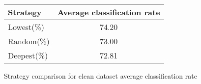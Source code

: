 \begin{figure}[h]
 \begin{center}
  \caption{Strategy comparison for clean dataset average classification rate}
   \begin{tabular}{ | l || c | }
    \hline
	 Strategy & Average classification rate \\ \hline \hline
        Lowest(\%) & 74.20 \\ \hline
        Random(\%) & 73.00 \\ \hline
        Deepest(\%) & 72.81 \\ \hline
    \end{tabular}
    \label{fig:averageClassificationRate}
\end{center}
\end{figure}




